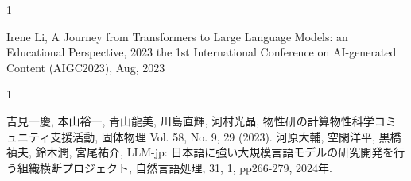 \begin{招待講演}{1}

Irene Li, A Journey from Transformers to Large Language Models: an Educational Perspective, 2023 the 1st International Conference on AI-generated Content (AIGC2023), Aug, 2023


\end{招待講演}

\begin{招待論文}{1}

吉見一慶, 本山裕一, 青山龍美, 川島直輝, 河村光晶,
物性研の計算物性科学コミュニティ支援活動,
固体物理 Vol. 58, No. 9, 29 (2023).
河原大輔, 空閑洋平, 黒橋禎夫, 鈴木潤, 宮尾祐介, LLM-jp: 日本語に強い大規模言語モデルの研究開発を行う組織横断プロジェクト, 自然言語処理, 31, 1, pp266-279, 2024年.





\end{招待論文}

